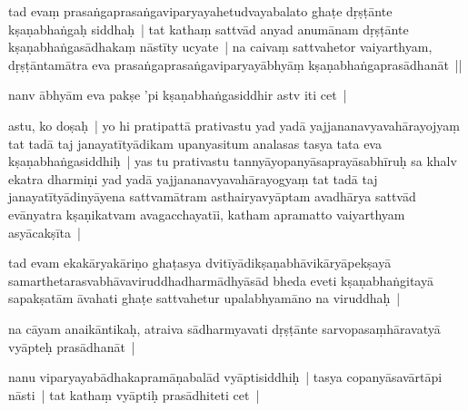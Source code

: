 \documentclass[article,12pt,a4paper]{memoir}%
\newcounter{parCount}
\begin{document}
	  \pstart \leavevmode%
	\label{thakur75-69.28}tad evaṃ prasaṅgaprasaṅgaviparyayahetudvayabalato ghaṭe dṛṣṭānte kṣaṇabhaṅgaḥ siddhaḥ | tat kathaṃ sattvād anyad anumānam dṛṣṭānte kṣaṇabhaṅgasādhakaṃ nāstīty ucyate | na caivaṃ sattvahetor vaiyarthyam, dṛṣṭāntamātra eva prasaṅgaprasaṅgaviparyayābhyāṃ kṣaṇabhaṅgaprasādhanāt ||
	{}
	\pend%
      

	  \pstart \leavevmode%
	\label{thakur75-70.1}nanv ābhyām eva pakṣe 'pi kṣaṇabhaṅgasiddhir astv iti cet | 
	{}
	\pend%
      

	  \pstart \leavevmode%
	\label{thakur75-70.1a}astu, ko doṣaḥ | yo hi pratipattā prativastu yad yadā yajjananavyavahārayojyaṃ tat tadā taj janayatītyādikam upanyasitum analasas tasya tata eva kṣaṇabhaṅgasiddhiḥ | yas tu prativastu tannyāyopanyāsaprayāsabhīruḥ sa khalv ekatra dharmiṇi yad yadā yajjananavyavahārayogyaṃ tat tadā taj janayatītyādinyāyena sattvamātram asthairyavyāptam avadhārya sattvād evānyatra kṣaṇikatvam avagacchayatīi, katham apramatto vaiyarthyam asyācakṣīta |
	{}
	\pend%
      

	  \pstart \leavevmode%
	\label{thakur75-70.6}tad evam ekakāryakāriṇo ghaṭasya dvitīyādikṣaṇabhāvikāryāpekṣayā samarthetarasvabhāvaviruddhadharmādhyāsād bheda eveti kṣaṇabhaṅgitayā sapakṣatām āvahati ghaṭe sattvahetur upalabhyamāno na viruddhaḥ | 
	{}
	\pend%
      

	  \pstart \leavevmode%
	\label{thakur75-70.9}na cāyam anaikāntikaḥ, atraiva sādharmyavati dṛṣṭānte sarvopasaṃhāravatyā vyāpteḥ prasādhanāt |
	{}
	\pend%
      

	  \pstart \leavevmode%
	\label{thakur75-70.10}nanu viparyayabādhakapramāṇabalād vyāptisiddhiḥ | tasya copanyāsavārtāpi nāsti | tat kathaṃ vyāptiḥ prasādhiteti cet | 
	{}
	\pend%
      
\end{document}

